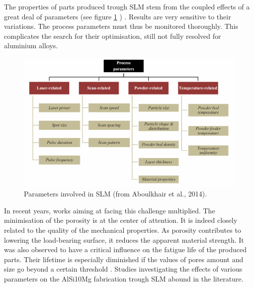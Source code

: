 The properties of parts produced trough SLM stem from the coupled effects of a great deal of parameters (see figure \ref{fig:param} ) \parencite{Aboulkair140820}.  %
Results are very sensitive to their variations. The process parameters must thus be monitored thoroughly. This complicates the search for their optimisation, still not fully resolved for aluminium alloys.\\%
\begin{figure}[th]
\centering
\includegraphics[scale=0.37]{Images/Param}
\decoRule

\caption[Parameters involved in SLM]{Parameters involved in SLM (from Aboulkhair et al., 2014).}
\label{fig:param}
\end{figure}

In recent years, works aiming at facing this challenge multiplied. The minimisation of the porosity is at the center of attention. It is indeed closely related to the quality of the mechanical properties. As porosity contributes to lowering the load-bearing surface, it reduces the apparent material strength. It was also observed to have a critical influence on the fatigue life of the produced parts. Their lifetime is especially diminished if the values of pores amount and size go beyond a certain threshold \parencite{Brandl121509}. Studies investigating the effects of various parameters on the AlSi10Mg fabrication trough SLM abound in the literature.\\

